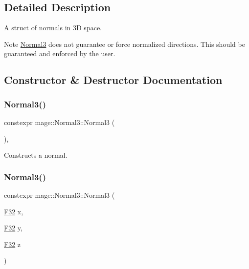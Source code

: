 \subsection{Detailed Description}
A struct of normals in 3D space.

\begin{DoxyNote}{Note}
{\ttfamily \hyperlink{structmage_1_1_normal3}{Normal3}} does not guarantee or force normalized directions. This should be guaranteed and enforced by the user. 
\end{DoxyNote}


\subsection{Constructor \& Destructor Documentation}
\hypertarget{structmage_1_1_normal3_a31cd202f6cda288c0b4702e232007b39}{}\label{structmage_1_1_normal3_a31cd202f6cda288c0b4702e232007b39} 
\subsubsection{\texorpdfstring{Normal3()}{Normal3()}\hspace{0.1cm}{\footnotesize\ttfamily [1/5]}}
{\footnotesize\ttfamily constexpr mage\+::\+Normal3\+::\+Normal3 (\begin{DoxyParamCaption}{ }\end{DoxyParamCaption})\hspace{0.3cm}{\ttfamily [default]}, {\ttfamily [noexcept]}}

Constructs a normal. \hypertarget{structmage_1_1_normal3_a7ff657d4eea97a894d0ee7ad3cb02a16}{}\label{structmage_1_1_normal3_a7ff657d4eea97a894d0ee7ad3cb02a16} 
\subsubsection{\texorpdfstring{Normal3()}{Normal3()}\hspace{0.1cm}{\footnotesize\ttfamily [2/5]}}
{\footnotesize\ttfamily constexpr mage\+::\+Normal3\+::\+Normal3 (\begin{DoxyParamCaption}\item[{\hyperlink{namespacemage_aa97e833b45f06d60a0a9c4fc22ae02c0}{F32}}]{x,  }\item[{\hyperlink{namespacemage_aa97e833b45f06d60a0a9c4fc22ae02c0}{F32}}]{y,  }\item[{\hyperlink{namespacemage_aa97e833b45f06d60a0a9c4fc22ae02c0}{F32}}]{z }\end{DoxyParamCaption})\hspace{0.3cm}{\ttfamily [noexcept]}}


